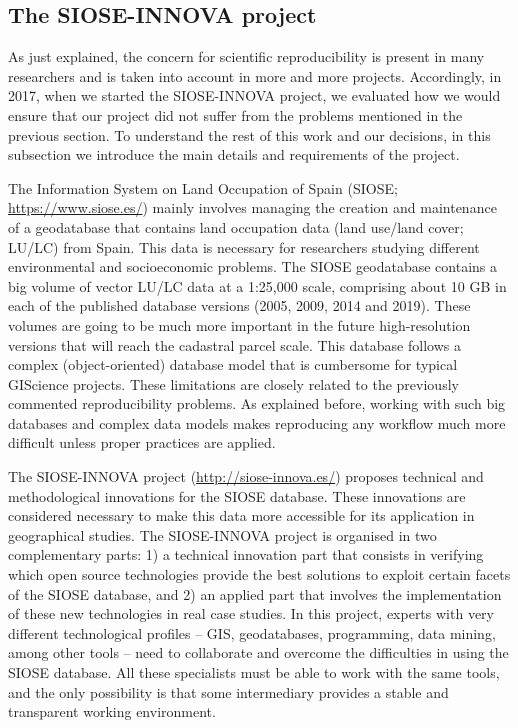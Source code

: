 \documentclass[ijgi,article,submit,moreauthors,pdftex]{Definitions/mdpi}
\begin{document}
\subsection{The SIOSE-INNOVA project}
\label{subsec:siose}

As just explained, the concern for scientific reproducibility is present in many researchers and is taken into account in more and more projects. Accordingly, in 2017, when we started the SIOSE-INNOVA project, we evaluated how we would ensure that our project did not suffer from the problems mentioned in the previous section. To understand the rest of this work and our decisions, in this subsection we introduce the main details and requirements of the project.

The Information System on Land Occupation of Spain (SIOSE; \url{https://www.siose.es/}) mainly involves managing the creation and maintenance of a geodatabase that contains land occupation data (land use/land cover; LU/LC) from Spain. This data is necessary for researchers studying different environmental and socioeconomic problems. The SIOSE geodatabase contains a big volume of vector LU/LC data at a 1:25,000 scale, comprising about 10 GB in each of the published database versions (2005, 2009, 2014 and 2019). These volumes are going to be much more important in the future high-resolution versions that will reach the cadastral parcel scale. This database follows a complex (object-oriented) database model that is cumbersome for typical GIScience projects. These limitations are closely related to the previously commented reproducibility problems. As explained before, working with such big databases and complex data models makes reproducing any workflow much more difficult unless proper practices are applied.

The SIOSE-INNOVA project (\url{http://siose-innova.es/}) proposes technical and methodological innovations for the SIOSE database. These innovations are considered necessary to make this data more accessible for its application in geographical studies. The SIOSE-INNOVA project is organised in two complementary parts: 1) a technical innovation part that consists in verifying which open source technologies provide the best solutions to exploit certain facets of the SIOSE database, and 2) an applied part that involves the implementation of these new technologies in real case studies. In this project, experts with very different technological profiles -- GIS, geodatabases, programming, data mining, among other tools -- need to collaborate and overcome the difficulties in using the SIOSE database. All these specialists must be able to work with the same tools, and the only possibility is that some intermediary provides a stable and transparent working environment.
\end{document}
